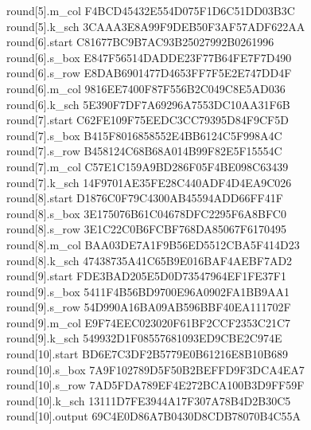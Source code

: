 \begin{tabbing}
  round[5].m\_col \> F4BCD45432E554D075F1D6C51DD03B3C \\
  round[5].k\_sch \> 3CAAA3E8A99F9DEB50F3AF57ADF622AA \\
  round[6].start \> C81677BC9B7AC93B25027992B0261996 \\
  round[6].s\_box \> E847F56514DADDE23F77B64FE7F7D490 \\
  round[6].s\_row \> E8DAB6901477D4653FF7F5E2E747DD4F \\
  round[6].m\_col \> 9816EE7400F87F556B2C049C8E5AD036 \\
  round[6].k\_sch \> 5E390F7DF7A69296A7553DC10AA31F6B \\
  round[7].start \> C62FE109F75EEDC3CC79395D84F9CF5D \\
  round[7].s\_box \> B415F8016858552E4BB6124C5F998A4C \\
  round[7].s\_row \> B458124C68B68A014B99F82E5F15554C \\
  round[7].m\_col \> C57E1C159A9BD286F05F4BE098C63439 \\
  round[7].k\_sch \> 14F9701AE35FE28C440ADF4D4EA9C026 \\
  round[8].start \> D1876C0F79C4300AB45594ADD66FF41F \\
  round[8].s\_box \> 3E175076B61C04678DFC2295F6A8BFC0 \\
  round[8].s\_row \> 3E1C22C0B6FCBF768DA85067F6170495 \\
  round[8].m\_col \> BAA03DE7A1F9B56ED5512CBA5F414D23 \\
  round[8].k\_sch \> 47438735A41C65B9E016BAF4AEBF7AD2 \\
  round[9].start \> FDE3BAD205E5D0D73547964EF1FE37F1 \\
  round[9].s\_box \> 5411F4B56BD9700E96A0902FA1BB9AA1 \\
  round[9].s\_row \> 54D990A16BA09AB596BBF40EA111702F \\
  round[9].m\_col \> E9F74EEC023020F61BF2CCF2353C21C7 \\
  round[9].k\_sch \> 549932D1F08557681093ED9CBE2C974E \\
  round[10].start \> BD6E7C3DF2B5779E0B61216E8B10B689 \\
  round[10].s\_box \> 7A9F102789D5F50B2BEFFD9F3DCA4EA7 \\
  round[10].s\_row \> 7AD5FDA789EF4E272BCA100B3D9FF59F \\
  round[10].k\_sch \> 13111D7FE3944A17F307A78B4D2B30C5 \\
  round[10].output \> 69C4E0D86A7B0430D8CDB78070B4C55A
\end{tabbing}

